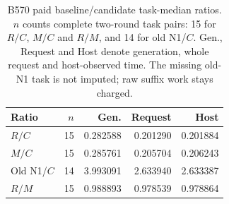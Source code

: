 \begin{table}[ht]\centering\small
\caption{B570 paid baseline/candidate task-median ratios. $n$ counts complete two-round task pairs: 15 for $R/C$, $M/C$ and $R/M$, and 14 for old N1/$C$. Gen., Request and Host denote generation, whole request and host-observed time. The missing old-N1 task is not imputed; raw suffix work stays charged.}\label{tab:b570_cost}
\setlength{\tabcolsep}{3pt}
\begin{tabular}{@{}lrrrr@{}}\toprule
Ratio & $n$ & Gen. & Request & Host\\\midrule
$R/C$ & 15 & 0.282588 & 0.201290 & 0.201884\\
$M/C$ & 15 & 0.285761 & 0.205704 & 0.206243\\
Old N1/$C$ & 14 & 3.993091 & 2.633940 & 2.633387\\
$R/M$ & 15 & 0.988893 & 0.978539 & 0.978864\\
\bottomrule\end{tabular}

\end{table}

